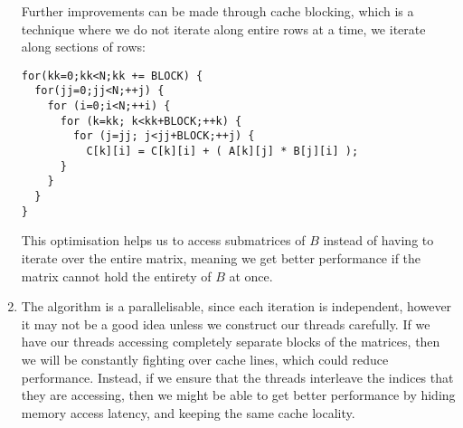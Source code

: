\begin{enumerate}[label=(\alph*)]
  Further improvements can be made through cache blocking, which is a technique where we do not iterate along entire rows at a time, we iterate along sections of rows:

\begin{verbatim}
for(kk=0;kk<N;kk += BLOCK) {
  for(jj=0;jj<N;++j) {
    for (i=0;i<N;++i) {
      for (k=kk; k<kk+BLOCK;++k) {
        for (j=jj; j<jj+BLOCK;++j) {
          C[k][i] = C[k][i] + ( A[k][j] * B[j][i] );
      }
    }
  }
}
\end{verbatim}

This optimisation helps us to access submatrices of $B$ instead of having to iterate over the entire matrix, meaning we get better performance if the matrix cannot hold the entirety of $B$ at once.

\item
  The algorithm is a parallelisable, since each iteration  is independent, however it may not be a good idea unless we construct our threads carefully. If we have our threads accessing completely separate blocks of the matrices, then we will be constantly fighting over cache lines, which could reduce performance. Instead, if we ensure that the threads interleave the indices that they are accessing, then we might be able to get better performance by hiding memory access latency, and keeping the same cache locality.
  
        
    \end{enumerate}


